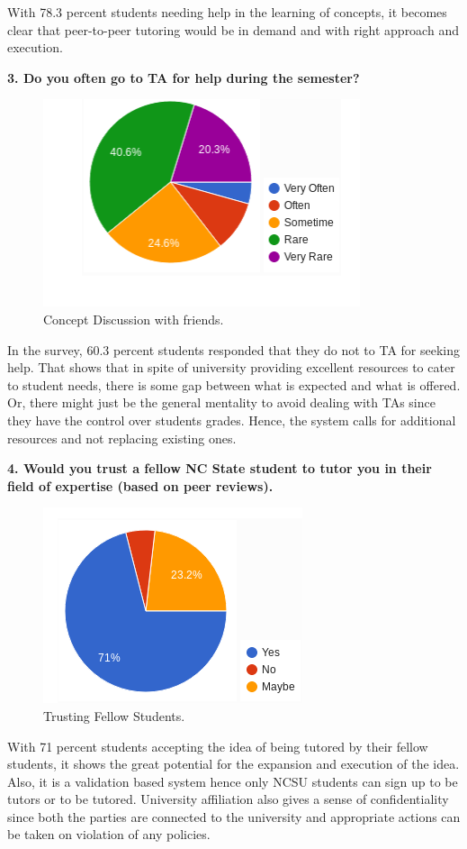 \documentclass{sig-alternate-05-2015}
\begin{document}
With 78.3 percent students needing help in the learning of concepts, it becomes clear that peer-to-peer tutoring would be in demand and with right approach and execution. 

\textbf {3. Do you often go to TA for help during the semester?}
\begin{figure}[ht]
\centering
\includegraphics{Q3SE}
\caption{Concept Discussion with friends.}
\end{figure}

In the survey, 60.3 percent students responded that they do not to TA for seeking help. That shows that in spite of university providing excellent resources to cater to student needs, there is some gap between what is expected and what is offered. Or, there might just be the general mentality to avoid dealing with TAs since they have the control over students grades. Hence, the system calls for additional resources and not replacing existing ones. 

\textbf {4. Would you trust a fellow NC State student to tutor you in their field of expertise (based on peer reviews).}
\begin{figure}[ht]
\centering
\includegraphics{Q4SE}
\caption{Trusting Fellow Students.}
\end{figure}

With 71 percent students accepting the idea of being tutored by their fellow students, it shows the great potential for the expansion and execution of the idea. Also, it is a validation based system hence only NCSU students can sign up to be tutors or to be tutored. University affiliation also gives a sense of confidentiality since both the parties are connected to the university and appropriate actions can be taken on violation of any policies. 
\end{document}
